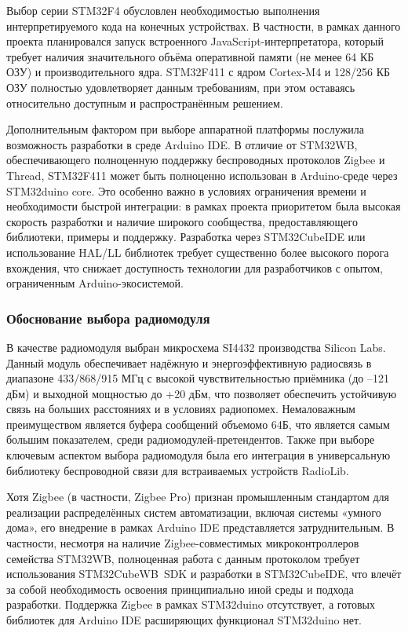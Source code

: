 \documentclass[a4paper,12pt]{article}
\begin{document}
Выбор серии STM32F4 обусловлен необходимостью выполнения интерпретируемого кода на конечных устройствах. В частности, в рамках данного проекта планировался запуск встроенного
JavaScript-интерпретатора, который требует наличия значительного объёма оперативной памяти (не менее 64 КБ ОЗУ) и производительного ядра. STM32F411 с ядром Cortex-M4 и 128/256 КБ
ОЗУ полностью удовлетворяет данным требованиям, при этом оставаясь относительно доступным и распространённым решением.

Дополнительным фактором при выборе аппаратной платформы послужила возможность разработки в среде Arduino IDE. В отличие от STM32WB, обеспечивающего полноценную поддержку беспроводных
протоколов Zigbee и Thread, STM32F411 может быть полноценно использован в Arduino-среде через STM32duino core. Это особенно важно в условиях ограничения времени и необходимости
быстрой интеграции: в рамках проекта приоритетом была высокая скорость разработки и наличие широкого сообщества, предоставляющего библиотеки, примеры и поддержку. Разработка через
STM32CubeIDE или использование HAL/LL библиотек требует существенно более высокого порога вхождения, что снижает доступность технологии для разработчиков с опытом, ограниченным
Arduino-экосистемой.

\subsubsection{Обоснование выбора радиомодуля}

В качестве радиомодуля выбран микросхема SI4432 производства Silicon Labs. Данный модуль обеспечивает надёжную и энергоэффективную радиосвязь в диапазоне 433/868/915 МГц с высокой
чувствительностью приёмника (до –121 дБм) и выходной мощностью до +20 дБм, что позволяет обеспечить устойчивую связь на больших расстояниях и в условиях радиопомех. Немаловажным
преимуществом является буфера сообщений объемомо 64Б, что является самым большим показателем, среди радиомодулей-претендентов. Также при выборе ключевым аспектом выбора радиомодуля
была его интеграция в универсальную библиотеку беспроводной связи для встраиваемых устройств RadioLib.

Хотя Zigbee (в частности, Zigbee Pro) признан промышленным стандартом для реализации распределённых систем автоматизации, включая системы «умного дома», его внедрение в рамках Arduino
IDE представляется затруднительным. В частности, несмотря на наличие Zigbee-совместимых микроконтроллеров семейства STM32WB, полноценная работа с данным протоколом требует
использования STM32CubeWB~SDK и разработки в STM32CubeIDE, что влечёт за собой необходимость освоения принципиально иной среды и подхода разработки. Поддержка Zigbee в
рамках STM32duino отсутствует, а готовых библиотек для Arduino IDE расширяющих функционал STM32duino нет.
\end{document}

